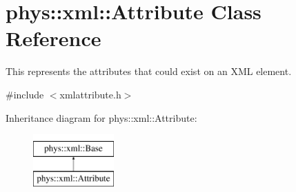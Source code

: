 \hypertarget{classphys_1_1xml_1_1Attribute}{
\section{phys::xml::Attribute Class Reference}
\label{da/ddf/classphys_1_1xml_1_1Attribute}
}


This represents the attributes that could exist on an XML element.  




{\ttfamily \#include $<$xmlattribute.h$>$}

Inheritance diagram for phys::xml::Attribute:\begin{figure}[H]
\begin{center}
\leavevmode
\includegraphics[height=2cm]{da/ddf/classphys_1_1xml_1_1Attribute}
\end{center}
\end{figure}
